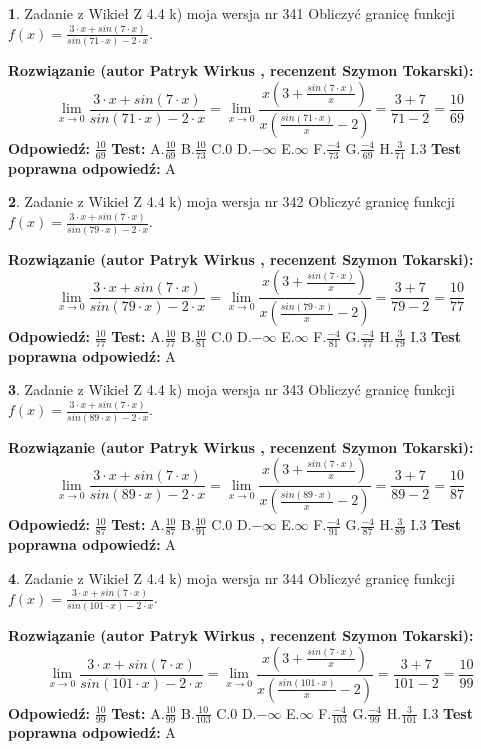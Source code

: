 \documentclass[12pt, a4paper]{article}
\theoremstyle{definition} %
\newtheorem{zad}{}
\newcommand{\zadStart}[1]{\begin{zad}#1\newline}
\newcommand{\zadStop}{\end{zad}}
\newcommand{\rozwStart}[2]{\noindent \textbf{Rozwiązanie (autor #1 , recenzent #2): }\newline}
\newcommand{\rozwStop}{\newline}
\newcommand{\odpStart}{\noindent \textbf{Odpowiedź:}\newline}
\newcommand{\odpStop}{\newline}
\newcommand{\testStart}{\noindent \textbf{Test:}\newline}
\newcommand{\testStop}{\newline}
\newcommand{\kluczStart}{\noindent \textbf{Test poprawna odpowiedź:}\newline}
\newcommand{\kluczStop}{\newline}
\begin{document}
\zadStart{Zadanie z Wikieł Z 4.4 k) moja wersja nr 341}
Obliczyć granicę funkcji $f(x)=\frac{3\cdot x +sin(7\cdot x)}{sin(71\cdot x) -2\cdot x}$.
\zadStop
\rozwStart{Patryk Wirkus}{Szymon Tokarski}
$$\lim\limits_{x\to 0}\frac{3\cdot x +sin(7\cdot x)}{sin(71\cdot x) -2\cdot x}
=\lim\limits_{x\to 0}\frac{x(3+\frac{sin(7\cdot x)}{x})}{x(\frac{sin(71\cdot x)}{x}-2)}
=\frac{3+7}{71-2} = \frac{10}{69}$$
\rozwStop
\odpStart
$\frac{10}{69}$
\odpStop
\testStart
A.$\frac{10}{69}$
B.$\frac{10}{73}$
C.$0$
D.$-\infty$
E.$\infty$
F.$\frac{-4}{73}$
G.$\frac{-4}{69}$
H.$\frac{3}{71}$
I.$3$
\testStop
\kluczStart
A
\kluczStop



\zadStart{Zadanie z Wikieł Z 4.4 k) moja wersja nr 342}
Obliczyć granicę funkcji $f(x)=\frac{3\cdot x +sin(7\cdot x)}{sin(79\cdot x) -2\cdot x}$.
\zadStop
\rozwStart{Patryk Wirkus}{Szymon Tokarski}
$$\lim\limits_{x\to 0}\frac{3\cdot x +sin(7\cdot x)}{sin(79\cdot x) -2\cdot x}
=\lim\limits_{x\to 0}\frac{x(3+\frac{sin(7\cdot x)}{x})}{x(\frac{sin(79\cdot x)}{x}-2)}
=\frac{3+7}{79-2} = \frac{10}{77}$$
\rozwStop
\odpStart
$\frac{10}{77}$
\odpStop
\testStart
A.$\frac{10}{77}$
B.$\frac{10}{81}$
C.$0$
D.$-\infty$
E.$\infty$
F.$\frac{-4}{81}$
G.$\frac{-4}{77}$
H.$\frac{3}{79}$
I.$3$
\testStop
\kluczStart
A
\kluczStop



\zadStart{Zadanie z Wikieł Z 4.4 k) moja wersja nr 343}
Obliczyć granicę funkcji $f(x)=\frac{3\cdot x +sin(7\cdot x)}{sin(89\cdot x) -2\cdot x}$.
\zadStop
\rozwStart{Patryk Wirkus}{Szymon Tokarski}
$$\lim\limits_{x\to 0}\frac{3\cdot x +sin(7\cdot x)}{sin(89\cdot x) -2\cdot x}
=\lim\limits_{x\to 0}\frac{x(3+\frac{sin(7\cdot x)}{x})}{x(\frac{sin(89\cdot x)}{x}-2)}
=\frac{3+7}{89-2} = \frac{10}{87}$$
\rozwStop
\odpStart
$\frac{10}{87}$
\odpStop
\testStart
A.$\frac{10}{87}$
B.$\frac{10}{91}$
C.$0$
D.$-\infty$
E.$\infty$
F.$\frac{-4}{91}$
G.$\frac{-4}{87}$
H.$\frac{3}{89}$
I.$3$
\testStop
\kluczStart
A
\kluczStop



\zadStart{Zadanie z Wikieł Z 4.4 k) moja wersja nr 344}
Obliczyć granicę funkcji $f(x)=\frac{3\cdot x +sin(7\cdot x)}{sin(101\cdot x) -2\cdot x}$.
\zadStop
\rozwStart{Patryk Wirkus}{Szymon Tokarski}
$$\lim\limits_{x\to 0}\frac{3\cdot x +sin(7\cdot x)}{sin(101\cdot x) -2\cdot x}
=\lim\limits_{x\to 0}\frac{x(3+\frac{sin(7\cdot x)}{x})}{x(\frac{sin(101\cdot x)}{x}-2)}
=\frac{3+7}{101-2} = \frac{10}{99}$$
\rozwStop
\odpStart
$\frac{10}{99}$
\odpStop
\testStart
A.$\frac{10}{99}$
B.$\frac{10}{103}$
C.$0$
D.$-\infty$
E.$\infty$
F.$\frac{-4}{103}$
G.$\frac{-4}{99}$
H.$\frac{3}{101}$
I.$3$
\testStop
\kluczStart
A
\kluczStop
\end{document}
